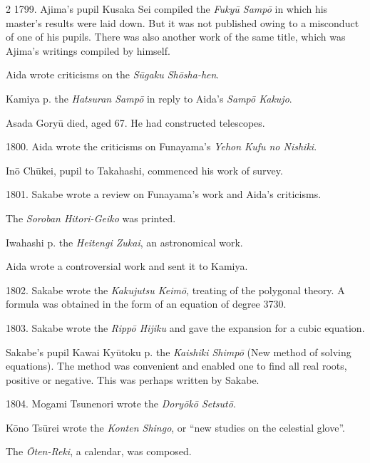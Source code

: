 \documentclass[11pt]{article}
\newcommand{\scanfooter}{}
\begin{document}
\begin{multicols}{2}
1799. Ajima's pupil Kusaka Sei compiled the \emph{Fukyū Sampō} in which his master's results were laid down. But it was not published owing to a misconduct of one of his pupils. There was also another work of the same title, which was Ajima's writings compiled by himself.

Aida wrote criticisms on the \emph{Sūgaku Shōsha-hen}.

Kamiya p. the \emph{Hatsuran Sampō} in reply to Aida's \emph{Sampō Kakujo}.

Asada Goryū died, aged 67. He had constructed telescopes.

1800. Aida wrote the criticisms on Funayama's \emph{Yehon Kufu no Nishiki}.

Inō Chūkei, pupil to Takahashi, commenced his work of survey.

1801. Sakabe wrote a review on Funayama's work and Aida's criticisms.

The \emph{Soroban Hitori-Geiko} was printed.

Iwahashi p. the \emph{Heitengi Zukai}, an astronomical work.

Aida wrote a controversial work and sent it to Kamiya.

1802. Sakabe wrote the \emph{Kakujutsu Keimō}, treating of the polygonal theory. A formula was obtained in the form of an equation of degree 3730.

1803. Sakabe wrote the \emph{Rippō Hijiku} and gave the expansion for a cubic equation.

Sakabe's pupil Kawai Kyūtoku p. the \emph{Kaishiki Shimpō} (New method of solving equations). The method was convenient and enabled one to find all real roots, positive or negative. This was perhaps written by Sakabe.

1804. Mogami Tsunenori wrote the \emph{Doryōkō Setsutō}.

Kōno Tsūrei wrote the \emph{Konten Shingo}, or ``new studies on the celestial glove''.

The \emph{Ōten-Reki}, a calendar, was composed.
\end{multicols}
\scanfooter
\end{document}
